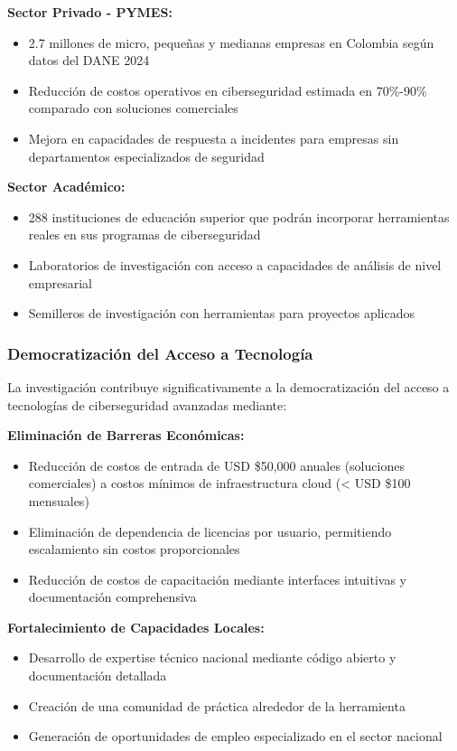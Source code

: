 \textbf{Sector Privado - PYMES:}
\begin{itemize}
    \item 2.7 millones de micro, pequeñas y medianas empresas en Colombia según datos del DANE 2024
    \item Reducción de costos operativos en ciberseguridad estimada en 70\%-90\% comparado con soluciones comerciales
    \item Mejora en capacidades de respuesta a incidentes para empresas sin departamentos especializados de seguridad
\end{itemize}

\textbf{Sector Académico:}
\begin{itemize}
    \item 288 instituciones de educación superior que podrán incorporar herramientas reales en sus programas de ciberseguridad
    \item Laboratorios de investigación con acceso a capacidades de análisis de nivel empresarial
    \item Semilleros de investigación con herramientas para proyectos aplicados
\end{itemize}

\subsubsection{Democratización del Acceso a Tecnología}
La investigación contribuye significativamente a la democratización del acceso a tecnologías de ciberseguridad avanzadas mediante:

\textbf{Eliminación de Barreras Económicas:}
\begin{itemize}
    \item Reducción de costos de entrada de USD \$50,000 anuales (soluciones comerciales) a costos mínimos de infraestructura cloud (< USD \$100 mensuales)
    \item Eliminación de dependencia de licencias por usuario, permitiendo escalamiento sin costos proporcionales
    \item Reducción de costos de capacitación mediante interfaces intuitivas y documentación comprehensiva
\end{itemize}

\textbf{Fortalecimiento de Capacidades Locales:}
\begin{itemize}
    \item Desarrollo de expertise técnico nacional mediante código abierto y documentación detallada
    \item Creación de una comunidad de práctica alrededor de la herramienta
    \item Generación de oportunidades de empleo especializado en el sector nacional
\end{itemize}

